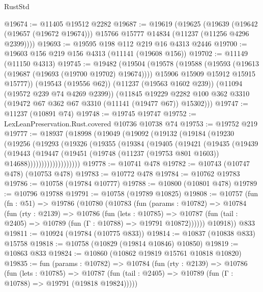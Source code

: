 \begin{lexlean}{RustStd}
\begin{coremodule}
@19674 := @11405 @19512 @2282
@19687 := @19619
    (@19625
      (@19639 (@19642 (@19657 (@19672 @19674))) @15766 @15777 @14834 (@11237 (@11256 @4296 @2399))))
@19693 := @19595 @198 @112 @219 @16 @4313 @2446
@19700 := @19603 @156 @219 @156 @4313 (@11141 (@19608 @156))
@19702 := @11149 (@11150 @4313)
@19745 := @19482
    (@19504
      (@19578
        (@19588
          (@19593 (@19613 (@19687 (@19693 (@19700 @19702) @19674))))
          @15906
          @15909
          @15912
          @15915
          @15777))
      (@19543 (@19556 @62))
      (@11237 (@19563 @1602 @239))
      (@11094 (@19572 @239 @74 @4269 @2399))
      (@11845
        @19229
        @2282
        @100
        @362
        @3310
        (@19472 @67 @362 @67 @3310 (@11141 (@19477 @67)) @15302)))
@19747 := @11237 (@10891 @74)
@19748 := @19745 @19747
@19752 := LexLeanPreservation.Rust.covered @10736 @10738 @74
@19753 := @19752 @219
@19777 := @18937
    (@18998
      (@19049
        (@19092
          (@19132
            (@19184
              (@19230
                (@19256
                  (@19293
                    (@19326
                      (@19355
                        (@19384
                          (@19405
                            (@19421
                              (@19435
                                (@19439
                                  (@19443
                                    (@19447
                                      (@19451
                                        (@19748
                                          (@11237 (@19753 @801 @1603))
                                          @14688)))))))))))))))))))
@19778 := @10741 @478
@19782 := @10743 (@10747 @478) (@10753 @478)
@19783 := @10772 @478
@19784 := @10762 @19783
@19786 := @10758 (@19784 @10777)
@19788 := @10800 (@10801 @478)
@19789 := @10796 @19788
@19791 := @10758 (@19789 @10825)
@19808 := @10757
    (fun (fn : @51) =>
    @19786
      (@10780
        (@10783
          (fun (params : @10782) =>
          @10784
            (fun (rty : @2139) =>
            @10786
              (fun (lets : @10785) =>
              @10787 (fun (tail : @2405) => @10789 (fun (Γ : @10788) => @19791 @10872))))))
        @10918))
    @833
@19811 := @10924 (@19784 (@10775 @833))
@19814 := @10837 (@10838 @833) @15758
@19818 := @10758 (@10829 (@19814 @10846) @10850)
@19819 := @10863 @833
@19824 := @10860 (@10862 @19819 @15761 @10818 @10820)
@19835 := fun (params : @10782) =>
  @10784
    (fun (rty : @2139) =>
    @10786
      (fun (lets : @10785) =>
      @10787 (fun (tail : @2405) => @10789 (fun (Γ : @10788) => @19791 (@19818 @19824)))))

\end{coremodule}
\end{lexlean}
